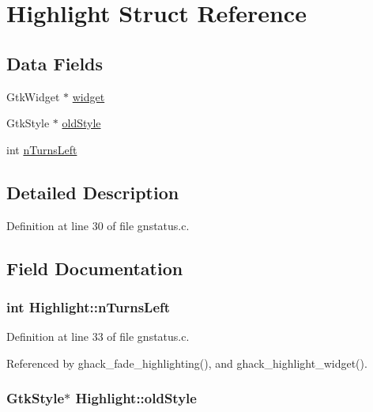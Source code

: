 \hypertarget{structHighlight}{\section{Highlight Struct Reference}
\label{structHighlight}
}
\subsection*{Data Fields}
\begin{DoxyCompactItemize}
\item 
Gtk\+Widget $\ast$ \hyperlink{structHighlight_a714326111ec667490ab456181396aff6}{widget}
\item 
Gtk\+Style $\ast$ \hyperlink{structHighlight_a3d03a6771ac362d89be326b53c78d23e}{old\+Style}
\item 
int \hyperlink{structHighlight_abb1c1355a79bb970d039a454d6e7c343}{n\+Turns\+Left}
\end{DoxyCompactItemize}


\subsection{Detailed Description}


Definition at line 30 of file gnstatus.\+c.



\subsection{Field Documentation}
\hypertarget{structHighlight_abb1c1355a79bb970d039a454d6e7c343}{
\subsubsection[{n\+Turns\+Left}]{\setlength{\rightskip}{0pt plus 5cm}int Highlight\+::n\+Turns\+Left}}\label{structHighlight_abb1c1355a79bb970d039a454d6e7c343}


Definition at line 33 of file gnstatus.\+c.



Referenced by ghack\+\_\+fade\+\_\+highlighting(), and ghack\+\_\+highlight\+\_\+widget().

\hypertarget{structHighlight_a3d03a6771ac362d89be326b53c78d23e}{
\subsubsection[{old\+Style}]{\setlength{\rightskip}{0pt plus 5cm}Gtk\+Style$\ast$ Highlight\+::old\+Style}}\label{structHighlight_a3d03a6771ac362d89be326b53c78d23e}


